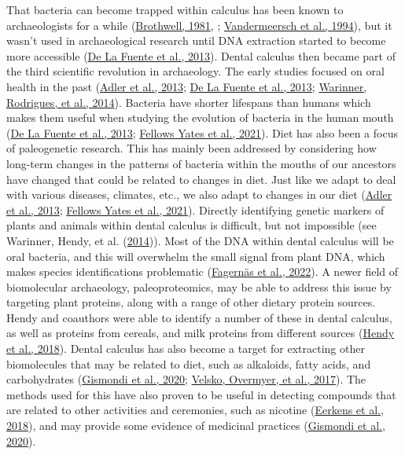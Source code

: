 \documentclass[
  letterpaper,
]{book}
\begin{document}
That bacteria can become trapped within calculus has been known to
archaeologists for a while
(\protect\hyperlink{ref-brothwellDiggingBones1981}{Brothwell, 1981}, ;
\protect\hyperlink{ref-vandermeerschMiddlePaleolithic1994}{Vandermeersch
et al., 1994}), but it wasn't used in archaeological research until DNA
extraction started to become more accessible
(\protect\hyperlink{ref-delafuenteDNAHuman2013}{De La Fuente et al.,
2013}). Dental calculus then became part of the third scientific
revolution in archaeology. The early studies focused on oral health in
the past (\protect\hyperlink{ref-adlerSequencingAncient2013}{Adler et
al., 2013}; \protect\hyperlink{ref-delafuenteDNAHuman2013}{De La Fuente
et al., 2013};
\protect\hyperlink{ref-warinnerPathogensHost2014}{Warinner, Rodrigues,
et al., 2014}). Bacteria have shorter lifespans than humans which makes
them useful when studying the evolution of bacteria in the human mouth
(\protect\hyperlink{ref-delafuenteDNAHuman2013}{De La Fuente et al.,
2013}; \protect\hyperlink{ref-yatesOralMicrobiome2021}{Fellows Yates et
al., 2021}). Diet has also been a focus of paleogenetic research. This
has mainly been addressed by considering how long-term changes in the
patterns of bacteria within the mouths of our ancestors have changed
that could be related to changes in diet. Just like we adapt to deal
with various diseases, climates, etc., we also adapt to changes in our
diet (\protect\hyperlink{ref-adlerSequencingAncient2013}{Adler et al.,
2013}; \protect\hyperlink{ref-yatesOralMicrobiome2021}{Fellows Yates et
al., 2021}). Directly identifying genetic markers of plants and animals
within dental calculus is difficult, but not impossible (see Warinner,
Hendy, et al. (\protect\hyperlink{ref-warinnerEvidenceMilk2014}{2014})).
Most of the DNA within dental calculus will be oral bacteria, and this
will overwhelm the small signal from plant DNA, which makes species
identifications problematic
(\protect\hyperlink{ref-fagernasMicrobialBiogeography2022}{Fagernäs et
al., 2022}). A newer field of biomolecular archaeology, paleoproteomics,
may be able to address this issue by targeting plant proteins, along
with a range of other dietary protein sources. Hendy and coauthors were
able to identify a number of these in dental calculus, as well as
proteins from cereals, and milk proteins from different sources
(\protect\hyperlink{ref-hendyProteomicCalculus2018}{Hendy et al.,
2018}). Dental calculus has also become a target for extracting other
biomolecules that may be related to diet, such as alkaloids, fatty
acids, and carbohydrates
(\protect\hyperlink{ref-gismondiMultidisciplinaryApproach2020}{Gismondi
et al., 2020}; \protect\hyperlink{ref-velskoDentalCalculus2017}{Velsko,
Overmyer, et al., 2017}). The methods used for this have also proven to
be useful in detecting compounds that are related to other activities
and ceremonies, such as nicotine
(\protect\hyperlink{ref-eerkensDentalCalculus2018}{Eerkens et al.,
2018}), and may provide some evidence of medicinal practices
(\protect\hyperlink{ref-gismondiMultidisciplinaryApproach2020}{Gismondi
et al., 2020}).
\end{document}
